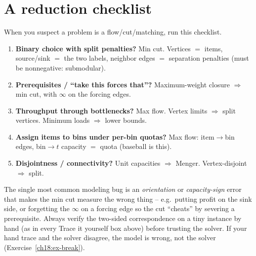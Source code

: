 \section{A reduction checklist}
\label{ch18:checklist}

\begin{focusbox}
When you suspect a problem is a flow/cut/matching, run this checklist.
\begin{enumerate}
\item \textbf{Binary choice with split penalties?} Min cut. Vertices $=$ items, source/sink $=$ the two labels, neighbor edges $=$ separation penalties (must be nonnegative: submodular).
\item \textbf{Prerequisites / ``take this forces that''?} Maximum-weight closure $\Rightarrow$ min cut, with $\infty$ on the forcing edges.
\item \textbf{Throughput through bottlenecks?} Max flow. Vertex limits $\Rightarrow$ split vertices. Minimum loads $\Rightarrow$ lower bounds.
\item \textbf{Assign items to bins under per-bin quotas?} Max flow: item$\to$bin edges, bin$\to t$ capacity $=$ quota (baseball is this).
\item \textbf{Disjointness / connectivity?} Unit capacities $\Rightarrow$ Menger. Vertex-disjoint $\Rightarrow$ split.
\end{enumerate}
\end{focusbox}

\begin{trapbox}
The single most common modeling bug is an \emph{orientation} or \emph{capacity-sign} error that makes the min cut measure the wrong thing -- e.g.\ putting profit on the sink side, or forgetting the $\infty$ on a forcing edge so the cut ``cheats'' by severing a prerequisite. Always verify the two-sided correspondence on a tiny instance by hand (as in every \textsf{Trace it yourself} box above) before trusting the solver. If your hand trace and the solver disagree, the model is wrong, not the solver (Exercise~\ref{ch18:ex-break}).
\end{trapbox}

